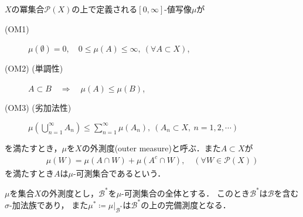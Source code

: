 		\begin{screen}
			\begin{dfn}[外測度]\label{def:outer_measure}
				$X$の冪集合$\mathcal{P}(X)$の上で定義される$[0,\infty]$-値写像$\mu$が
				\begin{description}
					\item[(OM1)] $\mu(\emptyset) = 0,\quad 0 \leq \mu(A) \leq \infty,\ (\forall A \subset X)$,
					\item[(OM2) (単調性)] $A \subset B \quad \Longrightarrow \quad \mu(A) \leq \mu(B)$,
					\item[(OM3) (劣加法性)] $\mu\left( \bigcup_{n=1}^\infty A_n \right) \leq \sum_{n=1}^\infty \mu(A_n),\ (A_n \subset X,\ n=1,2,\cdots)$
				\end{description}
				を満たすとき，$\mu$を$X$の外測度(outer measure)と呼ぶ．また$A \subset X$が
				\begin{align}
					\mu(W) = \mu(A \cap W) + \mu(A^c \cap W), \quad (\forall W \in \mathcal{P}(X))
				\end{align}
				を満たすとき$A$は$\mu$-可測集合であるという．
			\end{dfn}
		\end{screen}
		
		\begin{screen}
			\begin{thm}[Caratheodoryの拡張定理]\label{thm:Caratheodory_extension_theorem}
				$\mu$を集合$X$の外測度とし，$\mathcal{B}^*$を$\mu$-可測集合の全体とする．
				このとき$\mathcal{B}^*$は$\mathcal{B}$を含む$\sigma$-加法族であり，
				また$\mu^* \coloneqq \left. \mu \right|_{\mathcal{B}^*}$は$\mathcal{B}^*$の上の完備測度となる．
			\end{thm}
		\end{screen}
		

